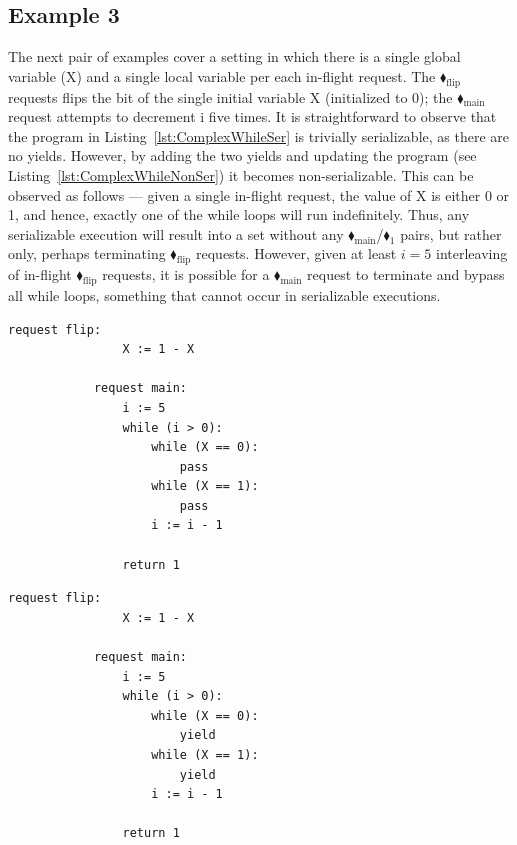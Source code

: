\subsection{Example 3}

The next pair of examples cover a setting in which there is a single global variable (X) and a single local variable per each in-flight request. The {\color{ForestGreen}$\blacklozenge_\text{flip}$} requests flips the bit of the single initial variable X (initialized to 0); the {\color{ForestGreen}$\blacklozenge_\text{main}$} request attempts to decrement i five times.
%
It is straightforward to observe that the program in Listing~\ref{lst:ComplexWhileSer} is trivially serializable, as there are no yields.
%
However, by adding the two yields and updating the program (see Listing~\ref{lst:ComplexWhileNonSer}) it becomes non-serializable. This can be observed as follows --- given a single in-flight request, the value of X is either 0 or 1, and hence, exactly one of the while loops will run indefinitely. Thus, any serializable execution will result into a set without any {\color{ForestGreen}$\blacklozenge_\text{main}$}/{\color{red}$\blacklozenge_1$} pairs, but rather only, perhaps terminating {\color{ForestGreen}$\blacklozenge_\text{flip}$} requests.
%
However, given at least $i=5$ interleaving of in-flight {\color{ForestGreen}$\blacklozenge_\text{flip}$} requests, it is possible for a {\color{ForestGreen}$\blacklozenge_\text{main}$} request to terminate and bypass all while loops, something that cannot occur in serializable executions.


\noindent
\begin{minipage}[t]{0.45\textwidth}
	\begin{lstlisting}[caption={Serializable},
		label={lst:ComplexWhileSer}]
		    request flip: 
		        X := 1 - X 
		    
		    request main:
		        i := 5
		        while (i > 0):
		            while (X == 0):
		                pass
		            while (X == 1):
		                pass
		            i := i - 1
		        
		        return 1       
				\end{lstlisting}
\end{minipage}%
\hfill
\begin{minipage}[t]{0.45\textwidth}
	\begin{lstlisting}[caption={Not serializable},
		label={lst:ComplexWhileNonSer}]
		    request flip: 
		        X := 1 - X 
		
		    request main:
		        i := 5
		        while (i > 0):
		            while (X == 0):
		                yield
		            while (X == 1):
		                yield
		            i := i - 1
		
		        return 1        
					\end{lstlisting}
\end{minipage}
	

